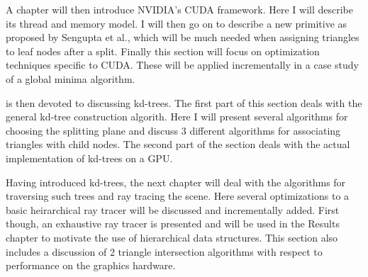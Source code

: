 
A chapter will then introduce NVIDIA's CUDA framework. Here I will
describe its thread and memory model. I will then go on to describe a
new primitive as proposed by Sengupta et al.,
which will be much needed when assigning triangles to leaf nodes after
a split. Finally this section will focus on optimization techniques
specific to CUDA. These will be applied incrementally in a case study
of a global minima algorithm.


 is then devoted to discussing kd-trees. The
first part of this section deals with the general kd-tree construction
algorith. Here I will present several algorithms for choosing the
splitting plane and discuss 3 different algorithms for associating
triangles with child nodes. The second part of the section deals with
the actual implementation of kd-trees on a GPU.


Having introduced kd-trees, the next chapter will deal with the
algorithms for traversing such trees and ray tracing the scene. Here
several optimizations to a basic heirarchical ray tracer will be
discussed and incrementally added. First though, an exhaustive ray
tracer is presented and will be used in the Results chapter to
motivate the use of hierarchical data structures. This section also
includes a discussion of 2 triangle intersection algorithms with
respect to performance on the graphics hardware.



